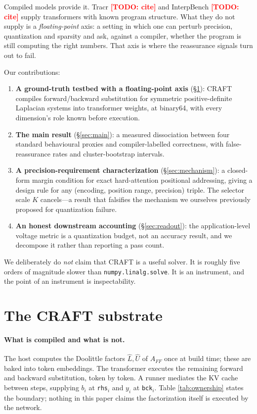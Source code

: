 \documentclass[11pt]{article}
\newcommand{\todo}[1]{\textcolor{red}{\textbf{[TODO: #1]}}}
\begin{document}
Compiled models provide it. Tracr \todo{cite} and InterpBench \todo{cite} supply
transformers with known program structure. What they do not supply is a
\emph{floating-point} axis: a setting in which one can perturb precision,
quantization and sparsity and ask, against a compiler, whether the program is
still computing the right numbers. That axis is where the reassurance signals
turn out to fail.

Our contributions:

\begin{enumerate}
\item \textbf{A ground-truth testbed with a floating-point axis} (\S\ref{sec:substrate}):
CRAFT compiles forward/backward substitution for symmetric positive-definite
Laplacian systems into transformer weights, at binary64, with every dimension's
role known before execution.
\item \textbf{The main result} (\S\ref{sec:main}): a measured dissociation between
four standard behavioural proxies and compiler-labelled correctness, with
false-reassurance rates and cluster-bootstrap intervals.
\item \textbf{A precision-requirement characterization} (\S\ref{sec:mechanism}):
a closed-form margin condition for exact hard-attention positional addressing,
giving a design rule for any (encoding, position range, precision) triple. The
selector scale $K$ cancels---a result that falsifies the mechanism we ourselves
previously proposed for quantization failure.
\item \textbf{An honest downstream accounting} (\S\ref{sec:readout}): the
application-level voltage metric is a quantization budget, not an accuracy
result, and we decompose it rather than reporting a pass count.
\end{enumerate}

We deliberately do \emph{not} claim that CRAFT is a useful solver. It is roughly
five orders of magnitude slower than \texttt{numpy.linalg.solve}. It is an
instrument, and the point of an instrument is inspectability.

\section{The CRAFT substrate}\label{sec:substrate}

\paragraph{What is compiled and what is not.} The host computes the Doolittle
factors $\hat L,\hat U$ of $A_{FF}$ once at build time; these are baked into
token embeddings. The transformer executes the remaining forward and backward
substitution, token by token. A runner mediates the KV cache between steps,
supplying $b_i$ at \texttt{rhs}$_i$ and $y_i$ at \texttt{bck}$_i$. Table
\ref{tab:ownership} states the boundary; nothing in this paper claims the
factorization itself is executed by the network.
\end{document}
